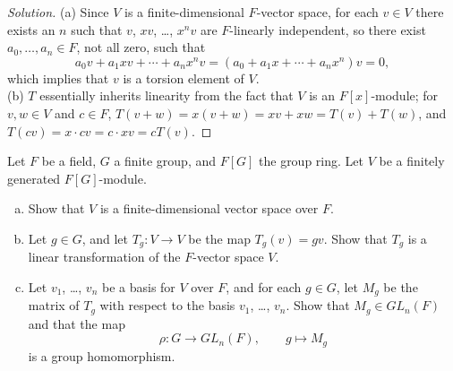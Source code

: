 \documentclass[10pt]{article}
\providecommand{\ii}{\item}
\newenvironment{soln}{\begin{proof}[Solution]}{\end{proof}}
\begin{document}
\begin{soln}
    (a) Since $V$ is a finite-dimensional $F$-vector space,
    for each $v\in V$ there exists an $n$ such that
    $v$, $xv$, \dots, $x^nv$ are $F$-linearly independent,
    so there exist $a_0,\dots,a_n\in F$, not all zero, such that
    \begin{equation*}
        a_0v + a_1xv + \cdots + a_nx^nv =
	(a_0 + a_1x + \cdots + a_nx^n)v = 0,
    \end{equation*}
    which implies that $v$ is a torsion element of $V$.
    \\

    (b) $T$ essentially inherits linearity from the fact that
    $V$ is an $F[x]$-module; for $v,w\in V$ and $c\in F$,
    $T(v+w) = x(v+w) = xv + xw = T(v)+T(w)$,
    and $T(cv) = x\cdot cv = c\cdot xv = cT(v)$.
\end{soln}

\pagebreak

\begin{problem}
    Let $F$ be a field, $G$ a finite group, and $F[G]$ the group ring.
    Let $V$ be a finitely generated $F[G]$-module.
    \begin{enumerate}[(a)]
        \ii Show that $V$ is a finite-dimensional vector space over $F$.
	\ii Let $g\in G$, and let $T_g\colon V\to V$ be the map $T_g(v) = gv$.
	Show that $T_g$ is a linear transformation of
	the $F$-vector space $V$.
	\ii Let $v_1$, \dots, $v_n$ be a basis for $V$ over $F$,
	and for each $g\in G$, let $M_g$ be the matrix of $T_g$
	with respect to the basis $v_1$, \dots, $v_n$.
	Show that $M_g\in GL_n(F)$ and that the map
	\begin{equation*}
	    \rho\colon G\to GL_n(F),\qquad g\mapsto M_g
	\end{equation*}
	is a group homomorphism.
    \end{enumerate}
\end{problem}
\end{document}
